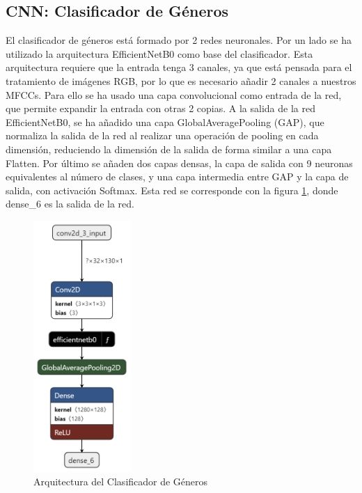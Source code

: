 \subsection{CNN: Clasificador de Géneros}
El clasificador de géneros está formado por 2 redes neuronales. Por un lado se ha utilizado la arquitectura EfficientNetB0 \cite{C:efficentnet} como base del clasificador. Esta arquitectura requiere que la entrada tenga 3 canales, ya que está pensada para el tratamiento de imágenes RGB, por lo que es necesario añadir 2 canales a nuestros MFCCs. Para ello se ha usado una capa convolucional como entrada de la red, que permite expandir la entrada con otras 2 copias.
A la salida de la red EfficientNetB0, se ha añadido una capa GlobalAveragePooling (GAP), que normaliza la salida de la red al realizar una operación de pooling en cada dimensión, reduciendo la dimensión de la salida de forma similar a una capa Flatten. Por último se añaden dos capas densas, la capa de salida con 9 neuronas equivalentes al número de clases, y una capa intermedia entre GAP y la capa de salida, con activación Softmax. Esta red se corresponde con la figura \ref{fig:C:cnn_0}, donde dense\_6 es la salida de la red.

\begin{figure}
    \centering
    \includegraphics[width=0.33\textwidth,height=\textheight,keepaspectratio]{img/C/cnn_genre_0.png}
    \caption{Arquitectura del Clasificador de Géneros}
    \label{fig:C:cnn_0}
\end{figure}


